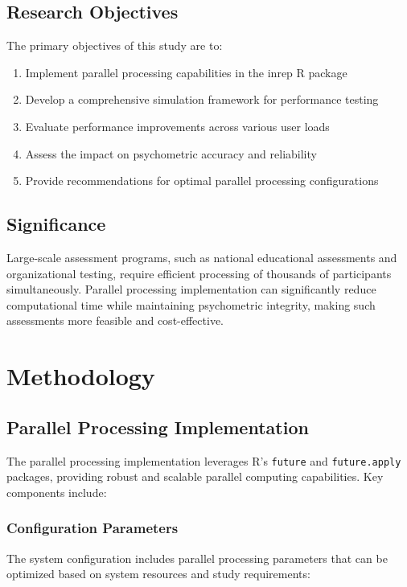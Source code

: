 \documentclass[11pt]{article}
\begin{document}
\subsection{Research Objectives}

The primary objectives of this study are to:

\begin{enumerate}
\item Implement parallel processing capabilities in the inrep R package
\item Develop a comprehensive simulation framework for performance testing
\item Evaluate performance improvements across various user loads
\item Assess the impact on psychometric accuracy and reliability
\item Provide recommendations for optimal parallel processing configurations
\end{enumerate}

\subsection{Significance}

Large-scale assessment programs, such as national educational assessments and organizational testing, require efficient processing of thousands of participants simultaneously. Parallel processing implementation can significantly reduce computational time while maintaining psychometric integrity, making such assessments more feasible and cost-effective.

\section{Methodology}

\subsection{Parallel Processing Implementation}

The parallel processing implementation leverages R's \texttt{future} and \texttt{future.apply} packages, providing robust and scalable parallel computing capabilities. Key components include:

\subsubsection{Configuration Parameters}
The system configuration includes parallel processing parameters that can be optimized based on system resources and study requirements:
\end{document}
